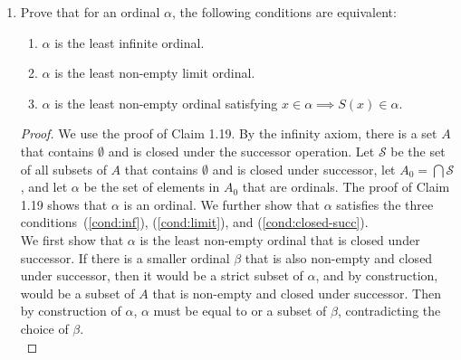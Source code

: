 \documentclass{article}
\begin{document}
\begin{enumerate}
\begin{proof}
      Now we show that $\alpha$ is the least ordinal satisfying this
      property. Let $\beta$ be an ordinal smaller than $\alpha=\cup X$. By
      Theorem 1.14.3, $\beta$ must be contained in $\alpha$, which means it
      is contained in some ordinal $x$ in $X$. By Theorem 1.14.3 again,
      $\beta$ cannot be larger or equal to $x$.
    \end{proof}

  \item Prove that for an ordinal $\alpha$, the following conditions are
    equivalent:
    \begin{enumerate}
      \item $\alpha$ is the least infinite ordinal. \label{cond:inf}
      \item $\alpha$ is the least non-empty limit ordinal.
        \label{cond:limit}
      \item $\alpha$ is the least non-empty ordinal satisfying
        $x\in\alpha\implies S(x)\in\alpha$. \label{cond:closed-succ}
    \end{enumerate}

    \begin{proof}
      We use the proof of Claim 1.19. By the infinity axiom, there is a
      set $A$ that contains $\emptyset$ and is closed under the successor
      operation. Let $\mathcal{S}$ be the set of all subsets of $A$ that
      contains $\emptyset$ and is closed under successor, let
      $A_0=\bigcap\mathcal{S}$, and let $\alpha$ be the set of elements in
      $A_0$ that are ordinals. The proof of Claim 1.19 shows that $\alpha$
      is an ordinal. We further show that $\alpha$ satisfies the three
      conditions~(\ref{cond:inf}), (\ref{cond:limit}), and
      (\ref{cond:closed-succ}). \\

      We first show that $\alpha$ is the least non-empty ordinal that is
      closed under successor. If there is a smaller ordinal $\beta$ that is
      also non-empty and closed under successor, then it would be a
      strict subset of $\alpha$, and by construction, would be a subset of
      $A$ that is non-empty and closed under successor. Then by
      construction of $\alpha$, $\alpha$ must be equal to or a subset of
      $\beta$, contradicting the choice of $\beta$. \\


\end{proof}
\end{enumerate}
\end{document}
